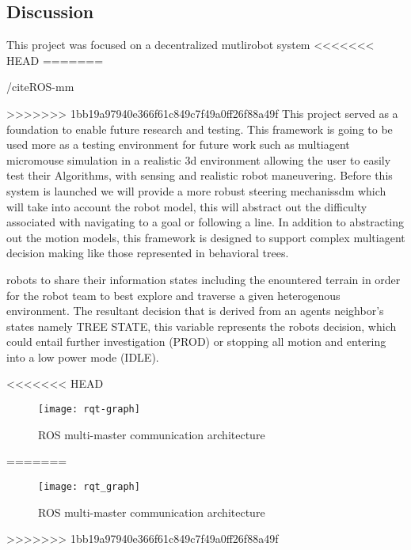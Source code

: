 \subsection{Discussion}

This project was focused on a decentralized mutlirobot system
<<<<<<< HEAD
=======

/cite{ROS-mm}

>>>>>>> 1bb19a97940e366f61c849c7f49a0ff26f88a49f
This project served as a foundation to enable future research and testing.
This framework is going to be used more as a testing environment for future work such
as multiagent micromouse simulation in a realistic 3d environment allowing the user to easily test
their Algorithms, with sensing and realistic robot maneuvering. Before this system is launched
we will provide a more robust steering mechanissdm which will take into account the robot model,
this will abstract out the difficulty associated with navigating to a goal or following a line.
In addition to abstracting out the motion models, this framework is designed to support complex
multiagent decision making like those represented in behavioral trees.

robots to share their information states including the enountered
terrain in order for the robot team to best explore and traverse a
given heterogenous environment. The resultant decision that is derived
from an agents neighbor's states namely TREE STATE, this variable
represents the robots decision, which could entail further investigation
(PROD) or stopping all motion and entering into a low power mode (IDLE).

<<<<<<< HEAD
\begin{figure}[H]
  \centering
    \texttt{[image: rqt-graph]}
  \caption{ROS multi-master communication architecture}
  \label{fig:comm}
\end{figure}
=======


\begin{figure}[H]
  \centering
    \texttt{[image: rqt\_graph]}
  \caption{ROS multi-master communication architecture}
  \label{fig:something3}
\end{figure}

>>>>>>> 1bb19a97940e366f61c849c7f49a0ff26f88a49f


